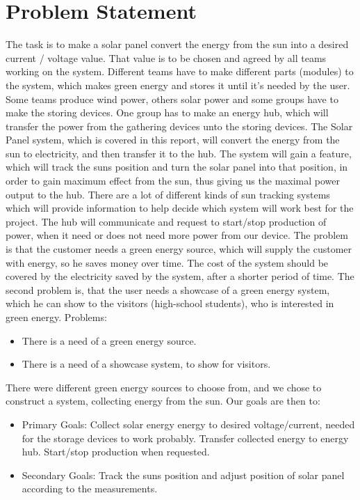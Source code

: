 \chapter{Problem Statement}
The task is to make a solar panel convert the energy from the sun into a desired current / voltage value. That value is to be chosen and agreed by all teams working on the system. Different teams have to make different parts (modules) to the system, which makes green energy and stores it until it’s needed by the user. Some teams produce wind power, others solar power and some groups have to make the storing devices. One group has to make an energy hub, which will transfer the power from the gathering devices unto the storing devices.
The Solar Panel system, which is covered in this report, will convert the energy from the sun to electricity, and then transfer it to the hub. The system will gain a feature, which will track the suns position and turn the solar panel into that position, in order to gain maximum effect from the sun, thus giving us the maximal power output to the hub. There are a lot of different kinds of sun tracking systems which will provide information to help decide which system will work best for the project. The hub will communicate and request to start/stop production of power, when it need or does not need more power from our device.
The problem is that the customer needs a green energy source, which will supply the customer with energy, so he saves money over time. The cost of the system should be covered by the electricity saved by the system, after a shorter period of time.
The second problem is, that the user needs a showcase of a green energy system, which he can show to the visitors (high-school students), who is interested in green energy.
Problems:
\begin{itemize}
\item There is a need of a green energy source.
\item There is a need of a showcase system, to show for visitors.
\end{itemize}
There were different green energy sources to choose from, and we chose to construct a system, collecting energy from the sun.
Our goals are then to:

\begin{itemize}
\item Primary Goals:
\subitem Collect solar energy
\subitem energy to desired voltage/current, needed for the storage devices to work probably.
\subitem Transfer collected energy to energy hub.
\subitem Start/stop production when requested.

\item Secondary Goals:
\subitem Track the suns position and adjust position of solar panel according to the measurements.
\end{itemize}

